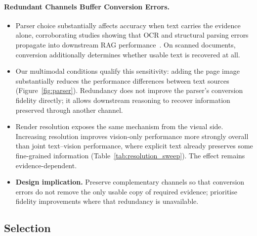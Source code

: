 \paragraph{Redundant Channels Buffer Conversion Errors.}
\begin{itemize}
    \item Parser choice substantially affects accuracy when text carries the evidence alone, corroborating studies showing that OCR and structural parsing errors propagate into downstream RAG performance~\citep{zhang2025ocr,sun2026when}. On scanned documents, conversion additionally determines whether usable text is recovered at all.

    \item Our multimodal conditions qualify this sensitivity: adding the page image substantially reduces the performance differences between text sources (Figure~\ref{fig:parser}). Redundancy does not improve the parser's conversion fidelity directly; it allows downstream reasoning to recover information preserved through another channel.

    \item Render resolution exposes the same mechanism from the visual side. Increasing resolution improves vision-only performance more strongly overall than joint text--vision performance, where explicit text already preserves some fine-grained information (Table~\ref{tab:resolution_sweep}). The effect remains evidence-dependent.

    \item \textbf{Design implication.} Preserve complementary channels so that conversion errors do not remove the only usable copy of required evidence; prioritise fidelity improvements where that redundancy is unavailable.
\end{itemize}

\subsection{Selection}
\label{sec:findings_selection}

